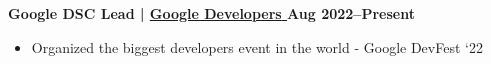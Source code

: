 \textbf{Google DSC Lead | 
\href{https://gdsc.community.dev/}{
    {Google Developers} 
} \hfill Aug 2022--Present}

\begin{itemize}[label=$\bullet$]
    \item Organized the biggest developers event in the world - Google DevFest `22
\end{itemize}\par
